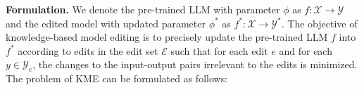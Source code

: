 \documentclass[acmsmall, screen]{acmart}
\begin{document}

\vspace{0.05in}
\noindent\textsf{\textbf{Formulation.}}
We denote the pre-trained LLM with parameter $\phi$ as $f:\mathcal{X}\rightarrow\mathcal{Y}$ and the edited model with updated parameter $\phi^*$ as $f^*:\mathcal{X}\rightarrow\mathcal{Y}^*$. The objective of knowledge-based model editing is to precisely update the pre-trained LLM $f$ into $f^{*}$ according to edits in the edit set $\mathcal{E}$ such that for each edit $e$ and for each $y \in \mathcal{Y}_{e}$, the changes to the input-output pairs irrelevant to the edits is minimized. The problem of KME can be formulated as follows:
\end{document}
